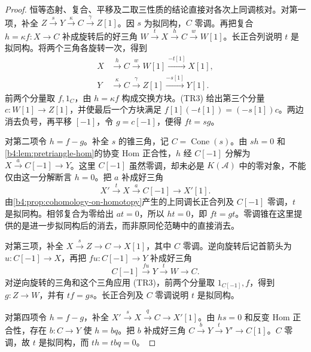 \begin{proof}
	恒等态射、复合、平移及二取三性质的结论直接对各次上同调核对。对第一项，补全 \(Z\xrightarrow{s}Y\xrightarrow{\kappa}C\xrightarrow{\gamma}Z[1]\)。因 \(s\) 为拟同构，\(C\) 零调。再把复合 \(h=\kappa f:X\to C\) 补成旋转后的好三角 \(W\xrightarrow{t}X\xrightarrow{h}C\xrightarrow{w}W[1]\)。长正合列说明 \(t\) 是拟同构。将两个三角各旋转一次，得到
	\[
		\begin{aligned}
			X&\xrightarrow{h}C\xrightarrow{w}W[1]\xrightarrow{-t[1]}X[1],\\
			Y&\xrightarrow{\kappa}C\xrightarrow{\gamma}Z[1]\xrightarrow{-s[1]}Y[1].
		\end{aligned}
	\]
	前两个分量取 \(f,1_C\)，由 \(h=\kappa f\) 构成交换方块。(TR3) 给出第三个分量 \(c:W[1]\to Z[1]\)，并使最后一个方块满足 \(f[1](-t[1])=(-s[1])c\)。两边消去负号，再平移 \([-1]\)，令 \(g=c[-1]\)，便得 \(ft=sg\)。

	对第二项令 \(h=f-g\)。补全 \(s\) 的锥三角，记 \(C=\operatorname{Cone}(s)\)。由 \(sh=0\) 和\cref{b4:lem:pretriangle-hom}的协变 Hom 正合性，\(h\) 经 \(C[-1]\) 分解为 \(X\xrightarrow{a}C[-1]\to Y\)。这里 \(C[-1]\) 虽然零调，却未必是 \(K(\mathcal A)\) 中的零对象，不能仅由这一分解断言 \(h=0\)。把 \(a\) 补成好三角
	\[
		X'\xrightarrow{t}X\xrightarrow{a}C[-1]\longrightarrow X'[1].
	\]
	由\cref{b4:prop:cohomology-on-homotopy}产生的上同调长正合列及 \(C[-1]\) 零调，\(t\) 是拟同构。相邻复合为零给出 \(at=0\)，所以 \(ht=0\)，即 \(ft=gt\)。零调锥在这里提供的是进一步拟同构后的消去，而非原同伦范畴中的直接消去。

	对第三项，补全 \(X\xrightarrow{s}Z\to C\to X[1]\)，其中 \(C\) 零调。逆向旋转后记首箭头为 \(u:C[-1]\to X\)，再把 \(fu:C[-1]\to Y\) 补成好三角
	\[
		C[-1]\xrightarrow{fu}Y\xrightarrow{t}W\to C.
	\]
	对逆向旋转的三角和这个三角应用 (TR3)，前两个分量取 \(1_{C[-1]},f\)，得到 \(g:Z\to W\)，并有 \(tf=gs\)。长正合列及 \(C\) 零调说明 \(t\) 是拟同构。

	对第四项令 \(h=f-g\)，补全 \(X'\xrightarrow{s}X\xrightarrow{q}C\to X'[1]\)。由 \(hs=0\) 和反变 Hom 正合性，存在 \(b:C\to Y\) 使 \(h=bq\)。把 \(b\) 补成好三角 \(C\xrightarrow{b}Y\xrightarrow{t}Y'\to C[1]\)。\(C\) 零调，故 \(t\) 是拟同构，而 \(th=tbq=0\)。
\end{proof}

